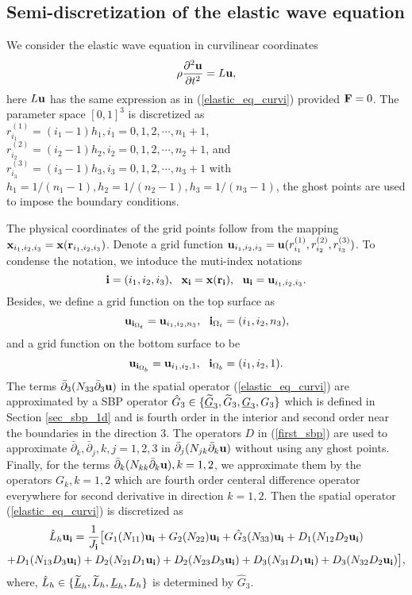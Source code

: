 \subsection{Semi-discretization of the elastic wave equation}

We consider the elastic wave equation in curvilinear coordinates 
\begin{equation}\label{elastic_equation}
\rho\frac{\partial^2 {\bf u}}{\partial t^2} = L{\bf u},
\end{equation}
here $L{\bf u}$ has the same expression as in (\ref{elastic_eq_curvi}) provided ${\bf F} = 0$. The parameter space $[0,1]^3$ is discretized as $r_{i_1}^{(1)} = (i_1-1)h_1, i_1 = 0,1,2,\cdots,n_1+1$, $r_{i_2}^{(2)} = (i_2-1)h_2, i_2 = 0,1,2,\cdots,n_2+1$, and $r_{i_3}^{(3)} = (i_3-1)h_3, i_3 = 0,1,2,\cdots,n_3+1$ with $h_1 = 1/(n_1-1), h_2 = 1/(n_2-1), h_3 = 1/(n_3-1)$, the ghost points are used to impose the boundary conditions.

The physical coordinates of the grid points follow from the mapping ${\bf x}_{i_1,i_2,i_3} = {\bf x}({\bf r}_{i_1,i_2,i_3})$. Denote a grid function ${\bf u}_{i_1,i_2,i_3} = {\bf u}(r_{i_1}^{(1)},r_{i_2}^{(2)},r_{i_3}^{(3)})$. To condense the notation, we intoduce the muti-index notations
\[{\bf i} = (i_1,i_2,i_3),\ \ {\bf x}_{\bf i} = {\bf x}({\bf r}_{\bf i}),\ \ {\bf u}_{\bf i} = {\bf u}_{i_1,i_2,i_3}.\]
Besides, we define a grid function on the top surface as
\[{\bf u}_{{\bf i}_{\Omega_t}} = {\bf u}_{i_1,i_2,n_3}, \ \ {\bf i}_{\Omega_t} = (i_1,i_2,n_3),\]
and a grid function on the bottom surface to be
\[{\bf u}_{{\bf i}_{\Omega_b}} = {\bf u}_{i_1,i_2,1}, \ \ {\bf i}_{\Omega_b} = (i_1,i_2,1).\]
The terms $\bar{\partial}_3(N_{33}\bar{\partial}_3{\bf u})$ in the spatial operator (\ref{elastic_eq_curvi}) are approximated by a SBP operator $\hat{G}_3\in\{\uline{\wt G}_3, \wt{G}_3, \uline{G}_3, G_3\}$ which is defined in Section \ref{sec_sbp_1d} and is fourth order in the interior and  second order near the boundaries in the direction $3$. The operators $D$ in  (\ref{first_sbp}) are used to approximate  $\bar{\partial}_k, \bar{\partial}_j, k,j = 1,2,3$ in $\bar{\partial}_j(N_{jk}\bar{\partial}_k{\bf u})$ without using any ghost points. Finally, for the terms $\bar{\partial}_k(N_{kk}\bar{\partial}_k{\bf u}), k = 1,2$, we approximate them by the operators $G_k, k = 1,2$ which are fourth order centeral difference operator everywhere for second derivative in direction $k = 1,2$. Then the spatial operator (\ref{elastic_eq_curvi}) is discretized as
\begin{multline}\label{discrete_elastic}
\hat{ L}_h{\bf u}_{\bf i} = \frac{1}{J_{\bf i}}\big[G_1(N_{11}){\bf u}_{\bf i}+G_2(N_{22}){\bf u}_{\bf i}+\hat{G}_3(N_{33}){\bf u}_{\bf i}+D_1(N_{12}D_2{\bf u}_{\bf i})\\
+D_1(N_{13}D_3{\bf u}_{\bf i})+D_2(N_{21}D_1{\bf u}_{\bf i})+D_2(N_{23}D_3{\bf u}_{\bf i})+D_3(N_{31}D_1{\bf u}_{\bf i})
+D_3(N_{32}D_2{\bf u}_{\bf i})\big],
\end{multline}
where, $\hat{L}_h\in\{\uline{\wt L}_h, \wt{L}_h, \uline{L}_h,L_h\}$ is determined by $\hat{G}_3$.